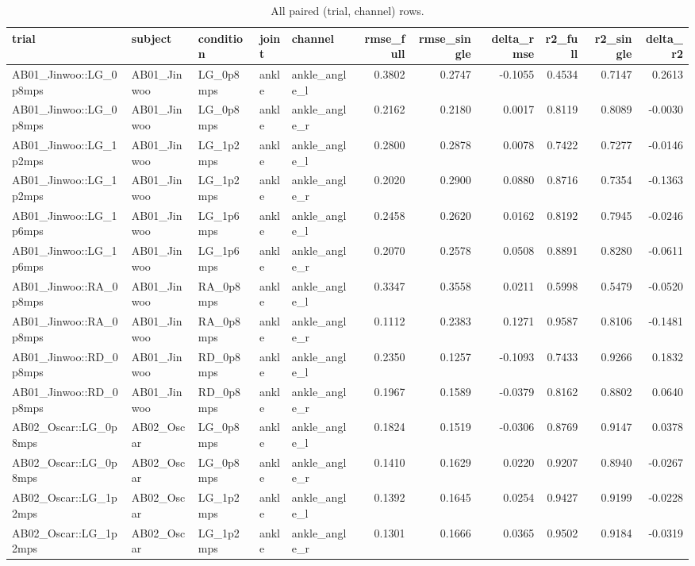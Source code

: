 \begin{table}
\caption{All paired (trial, channel) rows.}
\label{tab:table4_paired}
\begin{tabular}{lllllrrrrrr}
\toprule
trial & subject & condition & joint & channel & rmse_full & rmse_single & delta_rmse & r2_full & r2_single & delta_r2 \\
\midrule
AB01_Jinwoo::LG_0p8mps & AB01_Jinwoo & LG_0p8mps & ankle & ankle_angle_l & 0.3802 & 0.2747 & -0.1055 & 0.4534 & 0.7147 & 0.2613 \\
AB01_Jinwoo::LG_0p8mps & AB01_Jinwoo & LG_0p8mps & ankle & ankle_angle_r & 0.2162 & 0.2180 & 0.0017 & 0.8119 & 0.8089 & -0.0030 \\
AB01_Jinwoo::LG_1p2mps & AB01_Jinwoo & LG_1p2mps & ankle & ankle_angle_l & 0.2800 & 0.2878 & 0.0078 & 0.7422 & 0.7277 & -0.0146 \\
AB01_Jinwoo::LG_1p2mps & AB01_Jinwoo & LG_1p2mps & ankle & ankle_angle_r & 0.2020 & 0.2900 & 0.0880 & 0.8716 & 0.7354 & -0.1363 \\
AB01_Jinwoo::LG_1p6mps & AB01_Jinwoo & LG_1p6mps & ankle & ankle_angle_l & 0.2458 & 0.2620 & 0.0162 & 0.8192 & 0.7945 & -0.0246 \\
AB01_Jinwoo::LG_1p6mps & AB01_Jinwoo & LG_1p6mps & ankle & ankle_angle_r & 0.2070 & 0.2578 & 0.0508 & 0.8891 & 0.8280 & -0.0611 \\
AB01_Jinwoo::RA_0p8mps & AB01_Jinwoo & RA_0p8mps & ankle & ankle_angle_l & 0.3347 & 0.3558 & 0.0211 & 0.5998 & 0.5479 & -0.0520 \\
AB01_Jinwoo::RA_0p8mps & AB01_Jinwoo & RA_0p8mps & ankle & ankle_angle_r & 0.1112 & 0.2383 & 0.1271 & 0.9587 & 0.8106 & -0.1481 \\
AB01_Jinwoo::RD_0p8mps & AB01_Jinwoo & RD_0p8mps & ankle & ankle_angle_l & 0.2350 & 0.1257 & -0.1093 & 0.7433 & 0.9266 & 0.1832 \\
AB01_Jinwoo::RD_0p8mps & AB01_Jinwoo & RD_0p8mps & ankle & ankle_angle_r & 0.1967 & 0.1589 & -0.0379 & 0.8162 & 0.8802 & 0.0640 \\
AB02_Oscar::LG_0p8mps & AB02_Oscar & LG_0p8mps & ankle & ankle_angle_l & 0.1824 & 0.1519 & -0.0306 & 0.8769 & 0.9147 & 0.0378 \\
AB02_Oscar::LG_0p8mps & AB02_Oscar & LG_0p8mps & ankle & ankle_angle_r & 0.1410 & 0.1629 & 0.0220 & 0.9207 & 0.8940 & -0.0267 \\
AB02_Oscar::LG_1p2mps & AB02_Oscar & LG_1p2mps & ankle & ankle_angle_l & 0.1392 & 0.1645 & 0.0254 & 0.9427 & 0.9199 & -0.0228 \\
AB02_Oscar::LG_1p2mps & AB02_Oscar & LG_1p2mps & ankle & ankle_angle_r & 0.1301 & 0.1666 & 0.0365 & 0.9502 & 0.9184 & -0.0319 \\

\end{tabular}
\end{table}
